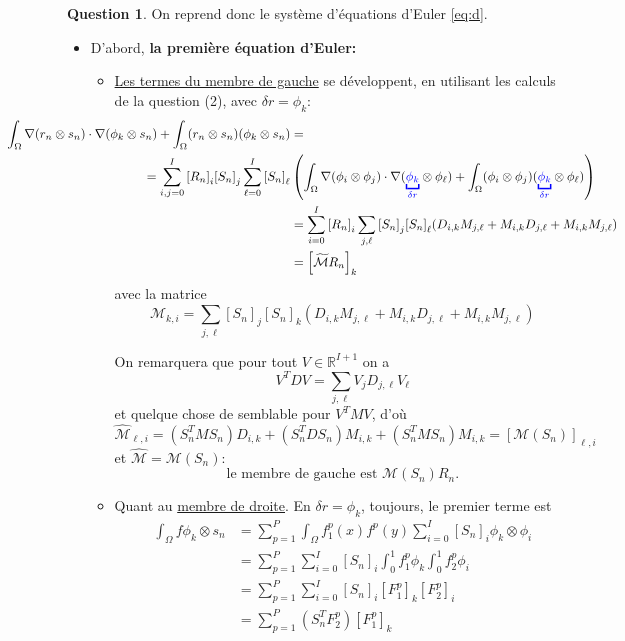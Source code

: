 \documentclass[11pt]{article}
\newcommand{\RR}{\mathbb{R}}
\theoremstyle{definition}
\newtheorem{ques}{Question}
\theoremstyle{plain}
\begin{document}
\begin{ques}On reprend donc le système d'équations d'Euler \eqref{eq:d}.

\begin{itemize}
\item D'abord, \textbf{la première équation d'Euler:}

\begin{itemize}
\item \underline{Les termes du membre de gauche} se développent, en utilisant les calculs de la question (2), avec $\delta r=\phi_k$:
\begin{align*}\hspace*{-3cm}
\int_\Omega \nabla(r_n\otimes s_n)\cdot\nabla(\phi_k \otimes s_n) + \int_\Omega (r_n\otimes s_n)(\phi_k\otimes s_n)
&=  \\
=
\sum_{i,j=0}^I {[R_n]}_i{[S_n]}_j\sum_{\ell=0}^I {[S_n]}_\ell &\left( \int_\Omega\nabla(\phi_i\otimes\phi_j)\cdot\nabla({\color{blue} \underbracket{\phi_k}_{\delta r}} \otimes\phi_\ell) + \int_\Omega(\phi_i\otimes\phi_j)({\color{blue} \underbracket{\phi_k}_{\delta r}} \otimes\phi_\ell)\right) \\
&= \sum_{i=0}^I {[R_n]}_i\sum_{j,\ell} {[S_n]}_j {[S_n]}_\ell(D_{i,k}M_{j,\ell} + M_{i,k}D_{j,\ell}+ M_{i,k}M_{j,\ell}) \\
&= {\left[\widetilde{\mathcal{M}}R_n\right]}_k
\end{align*}
avec la matrice
\[
\widehat{\mathcal{M}}_{k,i} = 
\sum_{j,\ell} {[S_n]}_j {[S_n]}_k(D_{i,k}M_{j,\ell} + M_{i,k}D_{j,\ell}+ M_{i,k}M_{j,\ell})
\]

On remarquera que pour tout $V\in\RR^{I+1}$ on a
\[
V^TDV = \sum_{j,\ell} V_jD_{j,\ell}V_\ell
\]
et quelque chose de semblable pour $V^TMV$, d'où
\[
\widehat{\mathcal{M}}_{\ell,i} = (S_n^TMS_n)D_{i,k} + (S_n^TDS_n)M_{i,k} + (S_n^TMS_n)M_{i,k} = \left[\mathcal{M}(S_n)\right]_{\ell,i}
\]
et $\widehat{\mathcal{M}} = \mathcal{M}(S_n)$:
\[
\boxed{\text{le membre de gauche est }\mathcal{M}(S_n)R_n.}
\]

\item Quant au \underline{membre de droite}. En $\delta r = \phi_k$, toujours, le premier terme est
\begin{align*}
\int_\Omega f\phi_k\otimes s_n
&= \sum_{p=1}^P\int_\Omega f^p_1(x)f^p(y)\sum_{i=0}^I{[S_n]}_i\phi_k\otimes\phi_i \\
&= \sum_{p=1}^P\sum_{i=0}^I{[S_n]}_i \int_0^1 f_1^p\phi_k \int_0^1 f_2^p\phi_i \\
&= \sum_{p=1}^P\sum_{i=0}^I{[S_n]}_i {[F_1^p]}_k {[F_2^p]}_i \\
&= \sum_{p=1}^P (S_n^TF_2^p){\left[ F_1^p\right]}_k
\end{align*}


\end{itemize}
\end{itemize}
\end{ques}
\end{document}
